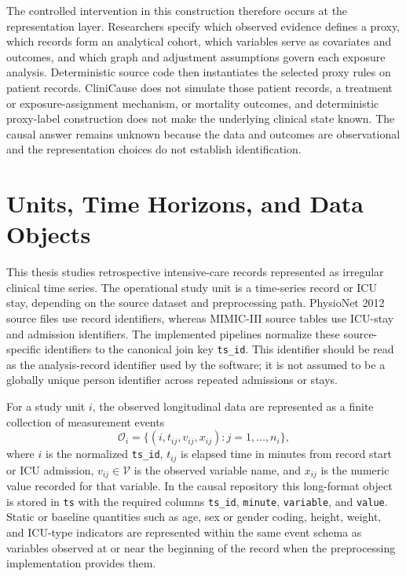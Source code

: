 The controlled intervention in this construction therefore occurs at the representation layer.  Researchers specify which observed evidence defines a proxy, which records form an analytical cohort, which variables serve as covariates and outcomes, and which graph and adjustment assumptions govern each exposure analysis.  Deterministic source code then instantiates the selected proxy rules on patient records.  CliniCause does not simulate those patient records, a treatment or exposure-assignment mechanism, or mortality outcomes, and deterministic proxy-label construction does not make the underlying clinical state known.  The causal answer remains unknown because the data and outcomes are observational and the representation choices do not establish identification.

\section{Units, Time Horizons, and Data Objects}
\label{sec:problem-definition-study-design:units-time-horizons-data-objects}

This thesis studies retrospective intensive-care records represented as irregular clinical time series.  The operational study unit is a time-series record or ICU stay, depending on the source dataset and preprocessing path.  PhysioNet 2012 source files use record identifiers, whereas MIMIC-III source tables use ICU-stay and admission identifiers.  The implemented pipelines normalize these source-specific identifiers to the canonical join key \texttt{ts\_id}.  This identifier should be read as the analysis-record identifier used by the software; it is not assumed to be a globally unique person identifier across repeated admissions or stays.

For a study unit \(i\), the observed longitudinal data are represented as a finite collection of measurement events
\[
  \mathcal{O}_i = \{(i,t_{ij},v_{ij},x_{ij}) : j=1,\ldots,n_i\},
\]
where \(i\) is the normalized \texttt{ts\_id}, \(t_{ij}\) is elapsed time in minutes from record start or ICU admission, \(v_{ij}\in\mathcal{V}\) is the observed variable name, and \(x_{ij}\) is the numeric value recorded for that variable.  In the causal repository this long-format object is stored in \texttt{ts} with the required columns \texttt{ts\_id}, \texttt{minute}, \texttt{variable}, and \texttt{value}.  Static or baseline quantities such as age, sex or gender coding, height, weight, and ICU-type indicators are represented within the same event schema as variables observed at or near the beginning of the record when the preprocessing implementation provides them.

